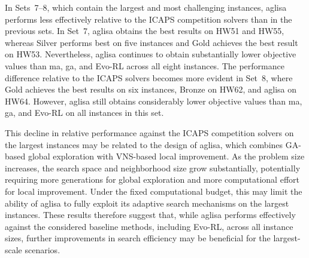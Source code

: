 \documentclass[pdflatex]{sn-jnl}
\begin{document}
In Sets~7--8, which contain the largest and most challenging instances, \gls{aglisa} performs less effectively relative to the ICAPS competition solvers than in the previous sets. In Set~7, \gls{aglisa} obtains the best results on HW51 and HW55, whereas Silver performs best on five instances and Gold achieves the best result on HW53. Nevertheless, \gls{aglisa} continues to obtain substantially lower objective values than \gls{ma}, \gls{ga}, and Evo-RL across all eight instances. The performance difference relative to the ICAPS solvers becomes more evident in Set~8, where Gold achieves the best results on six instances, Bronze on HW62, and \gls{aglisa} on HW64. However, \gls{aglisa} still obtains considerably lower objective values than \gls{ma}, \gls{ga}, and Evo-RL on all instances in this set.

This decline in relative performance against the ICAPS competition solvers on the largest instances may be related to the design of \gls{aglisa}, which combines GA-based global exploration with VNS-based local improvement. As the problem size increases, the search space and neighborhood size grow substantially, potentially requiring more generations for global exploration and more computational effort for local improvement. Under the fixed computational budget, this may limit the ability of \gls{aglisa} to fully exploit its adaptive search mechanisms on the largest instances. These results therefore suggest that, while \gls{aglisa} performs effectively against the considered baseline methods, including Evo-RL, across all instance sizes, further improvements in search efficiency may be beneficial for the largest-scale scenarios.




\end{document}
